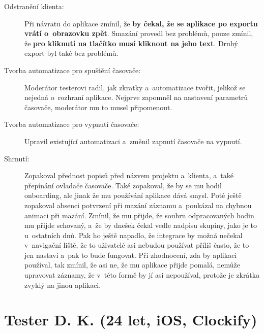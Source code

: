 \begin{description}
\item[Odstranění klienta:] Při návratu do aplikace zmínil, že \textbf{by čekal, že se aplikace po exportu vrátí o~obrazovku zpět}. Smazání provedl bez problémů, pouze zmínil, že \textbf{pro kliknutí na tlačítko musí kliknout na jeho text}. Druhý export byl také bez problémů.
\item[Tvorba automatizace pro spuštění časovače:] Moderátor testerovi radil, jak zkratky a~automatizace tvořit, jelikož se nejedná o~rozhraní aplikace. Nejprve zapomněl na nastavení parametrů časovače, moderátor mu to musel připomenout.
\item[Tvorba automatizace pro vypnutí časovače:] Upravil existující automatizaci a~změnil zapnutí časovače na vypnutí.
\item[Shrnutí:] Zopakoval přednost popisů před názvem projektu a~klienta, a~také přepínání ovladače časovače. Také zopakoval, že by se mu hodil onboarding, ale jinak že mu používání aplikace dává smysl. Poté ještě zopakoval absenci potvrzení při mazání záznamu a~poukázal na chybnou animaci při mazání. Zmínil, že mu přijde, že souhrn odpracovaných hodin mu přijde schovaný, a~že by dnešek čekal vedle nadpisu skupiny, jako je to u~ostatních dnů. Pak ho ještě napadlo, že integrace by možná nečekal v~navigační liště, že to uživatelé asi nebudou používat příliš často, že to jen nastaví a~pak to bude fungovat. Při zhodnocení, zda by aplikaci používal, tak zmínil, že asi ne, že mu aplikace přijde pomalá, nemůže upravovat záznamy, že v~této formě by jí asi nepoužíval, protože je zkrátka zvyklý na jinou aplikaci.
\end{description}

\section*{Tester D. K. (24 let, iOS, Clockify)}\label{tester:dk}

